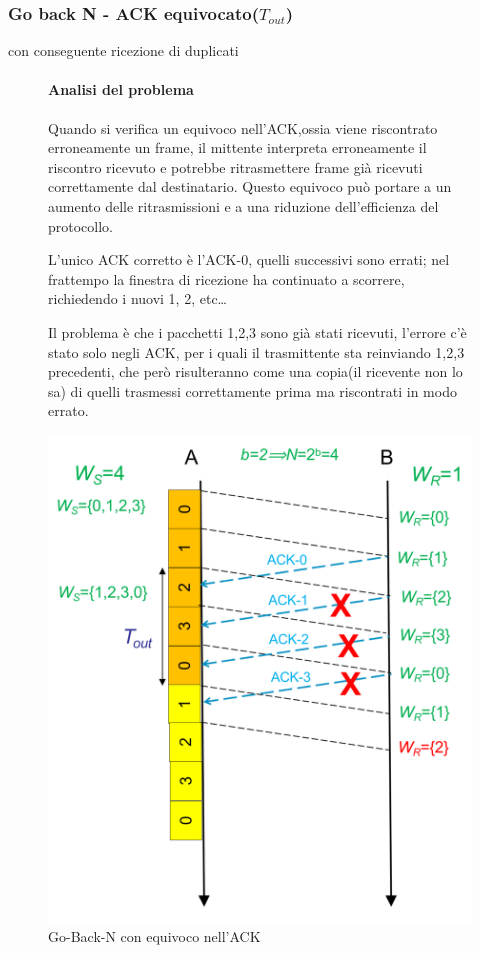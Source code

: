 \subsubsection{Go back N - ACK equivocato($T_{out}$)} 
con conseguente ricezione di duplicati


\begin{figure}[htbp]
    \centering
    \begin{minipage}{0.5\textwidth}
        \paragraph{Analisi del problema}
        Quando si verifica un equivoco nell'ACK,ossia viene riscontrato erroneamente un frame,  il mittente interpreta erroneamente il riscontro ricevuto e potrebbe ritrasmettere frame già ricevuti correttamente dal destinatario. 
        Questo equivoco può portare a un aumento delle ritrasmissioni e a una riduzione dell'efficienza del protocollo.

L'unico ACK corretto è l'ACK-0, quelli successivi sono errati; nel frattempo la finestra di ricezione ha continuato a scorrere, richiedendo i nuovi 1, 2, etc\dots

Il problema è che i pacchetti 1,2,3 sono già stati ricevuti, l'errore c'è stato solo negli ACK, per i quali il trasmittente sta reinviando 1,2,3 precedenti, che però risulteranno come una copia(il ricevente non lo sa) di quelli trasmessi correttamente prima ma riscontrati in modo errato.

    \end{minipage}%
    \hfill
    \begin{minipage}{0.45\textwidth}
        \includegraphics[width=\linewidth]{images/equivocoack.png}
        \caption{Go-Back-N con equivoco nell'ACK}
        

\end{minipage}
\end{figure}
